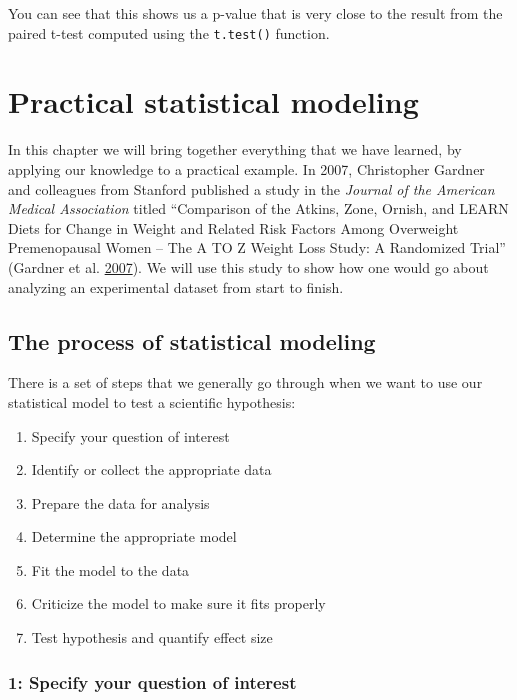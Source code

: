 \documentclass[12pt,]{book}
\providecommand{\tightlist}{%
  \setlength{\itemsep}{0pt}\setlength{\parskip}{0pt}}
\theoremstyle{definition}
\theoremstyle{definition}
\theoremstyle{definition}
\theoremstyle{remark}
\begin{document}
You can see that this shows us a p-value that is very close to the result from the paired t-test computed using the \texttt{t.test()} function.

\hypertarget{practical-example}{%
\chapter{Practical statistical modeling}\label{practical-example}}

In this chapter we will bring together everything that we have learned, by applying our knowledge to a practical example. In 2007, Christopher Gardner and colleagues from Stanford published a study in the \emph{Journal of the American Medical Association} titled ``Comparison of the Atkins, Zone, Ornish, and LEARN Diets for Change in Weight and Related Risk Factors Among Overweight Premenopausal Women -- The A TO Z Weight Loss Study: A Randomized Trial'' (Gardner et al. \protect\hyperlink{ref-gard:kiaz:alha:2007}{2007}). We will use this study to show how one would go about analyzing an experimental dataset from start to finish.

\hypertarget{the-process-of-statistical-modeling}{%
\section{The process of statistical modeling}\label{the-process-of-statistical-modeling}}

There is a set of steps that we generally go through when we want to use our statistical model to test a scientific hypothesis:

\begin{enumerate}
\def\labelenumi{\arabic{enumi}.}
\tightlist
\item
  Specify your question of interest
\item
  Identify or collect the appropriate data
\item
  Prepare the data for analysis
\item
  Determine the appropriate model
\item
  Fit the model to the data
\item
  Criticize the model to make sure it fits properly
\item
  Test hypothesis and quantify effect size
\end{enumerate}

\hypertarget{specify-your-question-of-interest}{%
\subsection{1: Specify your question of interest}\label{specify-your-question-of-interest}}
\end{document}

